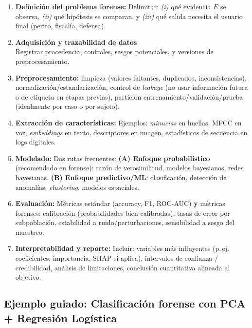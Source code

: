 \documentclass[a4paper,10pt,oneside]{article}
\begin{document}
\begin{enumerate}
\item \textbf{Definici\'on del problema forense:} Delimitar: \textit{(i)} qu\'e evidencia $E$ se observa, \textit{(ii)} qu\'e hip\'otesis se comparan, y \textit{(iii)} qu\'e salida necesita el usuario final (perito, fiscal\'ia, defensa).

\item \textbf{Adquisici\'on y trazabilidad de datos}\\
Registrar procedencia, controles, sesgos potenciales, y versiones de preprocesamiento.

\item \textbf{Preprocesamiento:} limpieza (valores faltantes, duplicados, inconsistencias), normalizaci\'on/estandarizaci\'on, control de \textit{leakage} (no usar informaci\'on futura o de etiqueta en etapas previas), partici\'on entrenamiento/validaci\'on/prueba (idealmente por caso o por sujeto).


\item \textbf{Extracci\'on de caracter\'isticas:} Ejemplos: \textit{minucias} en huellas, MFCC en voz, \textit{embeddings} en texto, descriptores en imagen, estad\'isticos de secuencia en logs digitales.

\item \textbf{Modelado:} Dos rutas frecuentes:  \textbf{(A) Enfoque probabil\'istico} (recomendado en forense): raz\'on de verosimilitud, modelos bayesianos, redes bayesianas. \textbf{(B) Enfoque predictivo/ML}: clasificaci\'on, detecci\'on de anomal\'ias, \textit{clustering}, modelos espaciales.

\item \textbf{Evaluaci\'on:} M\'etricas est\'andar (accuracy, F1, ROC-AUC) \textbf{y} m\'etricas forenses: calibraci\'on (probabilidades bien calibradas), tasas de error por subpoblaci\'on, estabilidad a ruido/perturbaciones, sensibilidad a sesgo del muestreo.

\item \textbf{Interpretabilidad y reporte:} Incluir: variables m\'as influyentes (p.\,ej. coeficientes, importancia, SHAP si aplica), intervalos de confianza / credibilidad, an\'alisis de limitaciones, conclusi\'on cuantitativa alineada al objetivo.

\end{enumerate}

\subsection{Ejemplo guiado: Clasificaci\'on forense con PCA + Regresi\'on Log\'istica}
\end{document}
